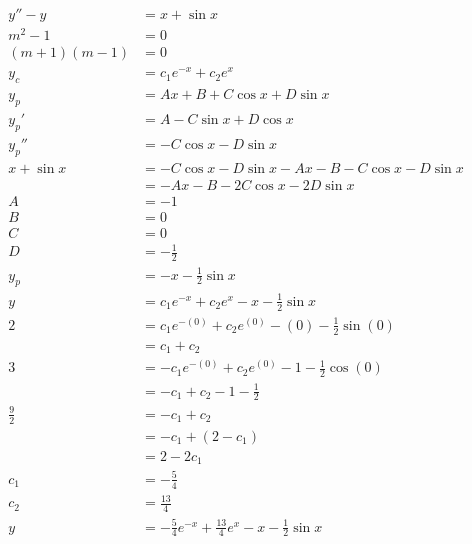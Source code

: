 \documentclass{article}
\begin{document}
\begin{align*}
  y'' - y         & = x + \sin x                                                      \\
  m^2 - 1         & = 0                                                               \\
  (m + 1) (m - 1) & = 0                                                               \\
  y_c             & = c_1 e^{-x} + c_2 e^x                                            \\
  y_p             & = A x + B + C \cos x + D \sin x                                   \\
  y_p'            & = A - C \sin x + D \cos x                                         \\
  y_p''           & = -C \cos x - D \sin x                                            \\
  x + \sin x      & = -C \cos x - D \sin x - A x - B - C \cos x - D \sin x            \\
                  & = -A x - B - 2 C \cos x - 2 D \sin x                              \\
  A               & = -1                                                              \\
  B               & = 0                                                               \\
  C               & = 0                                                               \\
  D               & = -\frac{1}{2}                                                    \\
  y_p             & = -x - \frac{1}{2} \sin x                                         \\
  y               & = c_1 e^{-x} + c_2 e^x - x - \frac{1}{2} \sin x                   \\
  2               & = c_1 e^{-(0)} + c_2 e^{(0)} - (0) - \frac{1}{2} \sin (0)         \\
                  & = c_1 + c_2                                                       \\
  3               & = -c_1 e^{-(0)} + c_2 e^{(0)} - 1 - \frac{1}{2} \cos (0)          \\
                  & = -c_1 + c_2 - 1 - \frac{1}{2}                                    \\
  \frac{9}{2}     & = -c_1 + c_2                                                      \\
                  & = -c_1 + (2 - c_1)                                                \\
                  & = 2 - 2 c_1                                                       \\
  c_1             & = -\frac{5}{4}                                                    \\
  c_2             & = \frac{13}{4}                                                    \\
  y               & = -\frac{5}{4} e^{-x} + \frac{13}{4} e^x - x - \frac{1}{2} \sin x
\end{align*}
\end{document}
